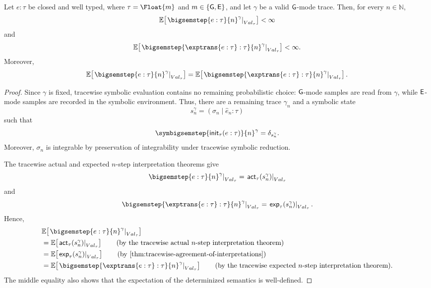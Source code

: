 \begin{theorem}
  \label{thm:tracewise-n-step-soundness}
  Let $e:\tau$ be closed and well typed, where
  $\tau=\Float{m}$ and $m\in\{\mathsf{G},\mathsf{E}\}$, and let $\gamma$ be a valid
  $\mathsf{G}$-mode trace. Then, for every $n\in\mathbb N$, 
  \[
    \mathbb E\!\left[
      \left.\bigsemstep{e:\tau}{n}^{\gamma}
      \right|_{Val_\tau}
    \right] < \infty
  \]
  and
  \[
    \mathbb E\!\left[
      \left.
      \bigsemstep{\exptrans{e:\tau}:\tau}{n}^{\gamma}
      \right|_{Val_\tau}
    \right] < \infty.
  \]
  Moreover,
  \[
    \mathbb E\!\left[
      \left.\bigsemstep{e:\tau}{n}^{\gamma}
      \right|_{Val_\tau}
    \right]
    =
    \mathbb E\!\left[
      \left.
      \bigsemstep{\exptrans{e:\tau}:\tau}{n}^{\gamma}
      \right|_{Val_\tau}
    \right].
  \]
\end{theorem}

\begin{proof}
  Since $\gamma$ is fixed, tracewise symbolic evaluation contains no
  remaining probabilistic choice: $\mathsf{G}$-mode samples are read from
  $\gamma$, while $\mathsf{E}$-mode samples are recorded in the symbolic
  environment. Thus, there are a remaining trace $\gamma_n$ and a
  symbolic state
  \[
    s_n^\gamma=(\sigma_n\mid\hat e_n:\tau)
  \]
  such that
  \[
    \symbigsemstep{\mathsf{init}_\tau(e:\tau)}{n}^{\gamma}
    =
    \delta_{s_n^\gamma}.
  \]
  Moreover, $\sigma_n$ is integrable by preservation of integrability
  under tracewise symbolic reduction.

  The tracewise actual and expected $n$-step interpretation theorems give
  \[
    \left.\bigsemstep{e:\tau}{n}^{\gamma}
    \right|_{Val_\tau}
    =
    \left.\mathsf{act}_\tau(s_n^\gamma)\right|_{Val_\tau}
  \]
  and
  \[
    \left.
    \bigsemstep{\exptrans{e:\tau}:\tau}{n}^{\gamma}
    \right|_{Val_\tau}
    =
    \left.\mathsf{exp}_\tau(s_n^\gamma)\right|_{Val_\tau}.
  \]
  Hence,
  \begin{align}
    &\mathbb E\!\left[
      \left.\bigsemstep{e:\tau}{n}^{\gamma}
      \right|_{Val_\tau}
    \right]
    \notag
    \\
    &=
    \mathbb E\!\left[
      \left.\mathsf{act}_\tau(s_n^\gamma)\right|_{Val_\tau}
    \right]
    \tag{\text{by the tracewise actual $n$-step interpretation theorem}}
    \\
    &=
    \mathbb E\!\left[
      \left.\mathsf{exp}_\tau(s_n^\gamma)\right|_{Val_\tau}
    \right]
    \tag{\text{by \Cref{thm:tracewise-agreement-of-interpretations}}}
    \\
    &=
    \mathbb E\!\left[
      \left.
      \bigsemstep{\exptrans{e:\tau}:\tau}{n}^{\gamma}
      \right|_{Val_\tau}
    \right]
    \tag{\text{by the tracewise expected $n$-step interpretation theorem}}.
  \end{align}
  The middle equality also shows that the expectation of the
  determinized semantics is well-defined.
\end{proof}

